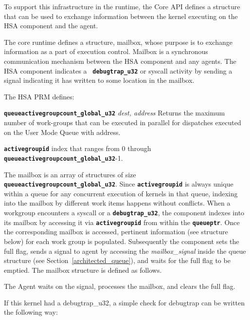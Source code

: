 \documentclass{book}
\newcommand{\diffblock}[1]{#1}
\newcommand{\ttbf}[1]{\diffblock{\texttt{\textbf{#1}}}}
\begin{document}
To support this infrastructure in the runtime, the Core A\-P\-I
defines a structure that can be used to exchange information between
the kernel executing on the H\-S\-A component and the agent.

The core runtime defines a structure, mailbox, whose purpose is to
exchange information as a part of execution control. Mailbox is a
synchronous communication mechanism between the H\-S\-A component
and any agents. The H\-S\-A component indicates a \ttbf{
debugtrap\_u32} or syscall activity by sending a signal indicating
it has written to some location in the mailbox.

The HSA PRM defines:

\begin{description}
\item \ttbf{queueactivegroupcount\_global\_u32}  {\itshape dest, address}
Returns the maximum number of work-groups that can be executed in
parallel for dispatches executed on the User Mode Queue with
address.

\item \ttbf{activegroupid} index that ranges from 0 through
\ttbf{queueactivegroupcount\_global\_u32}-1.
\end{description}

The mailbox is an array of structures of size
\ttbf{queueactivegroupcount\_global\_u32}. Since
\ttbf{activegroupid} is always unique within a queue for any
concurrent execution of kernels in that queue, indexing into the
mailbox by different work items happens without conflicts. When a
workgroup encounters a syscall or a \ttbf{debugtrap\_u32}, the
component indexes into its mailbox by accessing it via
\ttbf{activegroupid} from within the \ttbf{queueptr}. Once the
corresponding mailbox is accessed, pertinent information (see
structure below) for each work group is populated.  Subsequently the
component sets the full flag, sends a signal to agent by accessing the
{\itshape mailbox\_signal} inside the queue structure (see
Section~\ref{architected_queue}), and waits for the full flag to be
emptied. The mailbox structure is defined as follows.



The Agent waits on the signal, processes the mailbox, and clears
the full flag.

If this kernel had a debugtrap\-\_\-u32, a simple check for
debugtrap can be written the following way\-:

\begin{framed}

\end{framed}
\end{document}
